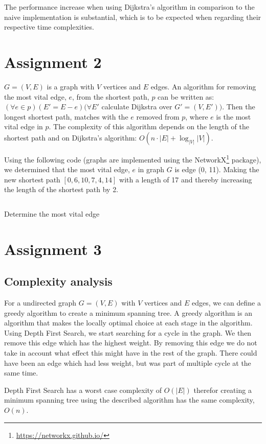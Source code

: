 \documentclass[a4paper,12px]{article}
\begin{document}
The performance increase when using Dijkstra's algorithm in comparison to the
naive implementation is substantial, which is to be expected when regarding
their respective time complexities.

\section{Assignment 2} $G = (V, E)$ is a graph with $V$ vertices and $E$ edges.
An algorithm for removing the most vital edge, $e$, from the shortest path, $p$
can be written as: $(\forall e \in p)(E' = E - e)(\forall E' $ calculate
Dijkstra over $G' = (V, E'))$. Then the longest shortest path, matches with the
$e$ removed from $p$, where $e$ is the most vital edge in $p$.  The complexity
of this algorithm depends on the length of the shortest path and on Dijkstra's
algorithm: $O(n \cdot |E| + \log_{|V|}{|V|})$.

Using the following code (graphs are implemented using the
NetworkX\footnote{\url{https://networkx.github.io/}} package), we determined that the most vital edge, $e$ in graph
$G$ is edge (0, 11). Making the new shortest path $[0,6,10,7,4,14]$ with a
length of 17 and thereby increasing the length of the shortest path by 2.

\begin{listing}[H]
\inputminted[firstline=4,lastline=32,fontsize=\footnotesize]{python}{2.py}
\caption{Determine the most vital edge}
\end{listing}


\section{Assignment 3}
\subsection{Complexity analysis}
For a undirected graph $G = (V,E)$ with $V$ vertices and $E$ edges, we can define a greedy
algorithm to create a minimum spanning tree. A greedy algorithm is an algorithm that
makes the locally optimal choice at each stage in the algorithm. Using Depth
First Search, we start searching for a cycle in the graph. We then remove this
edge which has the highest weight. By removing this edge we do not take in
account what effect this might have in the rest of the graph. There could have
been an edge which had less weight, but was part of multiple cycle at the same
time.

Depth First Search has a worst case complexity of $O(|E|)$ therefor creating a
minimum spanning tree using the described algorithm has the same complexity,
$O(n)$.
\end{document}
